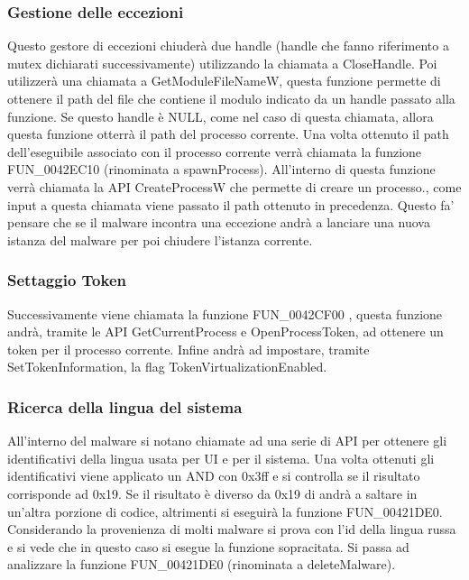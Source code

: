 \documentclass[]{article}
\begin{document}
\subsubsection{Gestione delle eccezioni}
Questo gestore di eccezioni chiuderà due handle (handle che fanno riferimento a mutex dichiarati successivamente) utilizzando la chiamata a CloseHandle. Poi utilizzerà una chiamata a GetModuleFileNameW, questa funzione permette di ottenere il path del file che contiene il modulo indicato da un handle passato alla funzione. Se questo handle è NULL, come nel caso di questa chiamata, allora questa funzione otterrà il path del processo corrente. Una volta ottenuto il path dell'eseguibile associato con il processo corrente verrà chiamata la funzione FUN\_0042EC10 (rinominata a spawnProcess). All'interno di questa funzione verrà chiamata la API CreateProcessW che permette di creare un processo., come input a questa chiamata viene passato il path ottenuto in precedenza. Questo fa' pensare che se il malware incontra una eccezione andrà a lanciare una nuova istanza del malware per poi chiudere l'istanza corrente.

\subsubsection{Settaggio Token}
Successivamente viene chiamata la funzione FUN\_0042CF00 , questa funzione andrà, tramite le API GetCurrentProcess e OpenProcessToken, ad ottenere un token per il processo corrente. Infine andrà ad impostare, tramite SetTokenInformation, la flag TokenVirtualizationEnabled.

\subsubsection{Ricerca della lingua del sistema}
All'interno del malware si notano chiamate ad una serie di API per ottenere gli identificativi della lingua usata per UI e per il sistema. Una volta ottenuti gli identificativi viene applicato un AND con 0x3ff e si controlla se il risultato corrisponde ad 0x19. Se il risultato è diverso da 0x19 di andrà a saltare in un'altra porzione di codice, altrimenti si eseguirà la funzione FUN\_00421DE0.
Considerando la provenienza di molti malware si prova con l'id della lingua russa e si vede che in questo caso si esegue la funzione sopracitata. Si passa ad analizzare la funzione FUN\_00421DE0 (rinominata a deleteMalware). 
\end{document}
